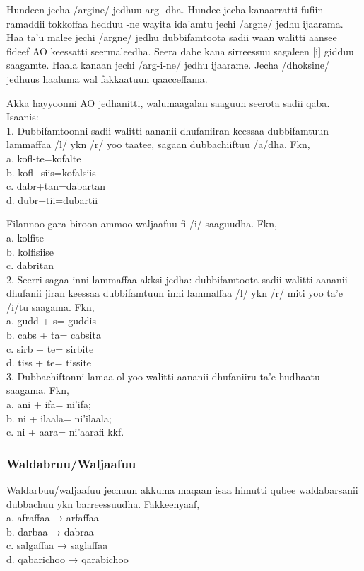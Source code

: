 \documentclass[11pt,b5paper]{book}
\begin{document}
\begin{itemize}
Hundeen jecha /argine/ jedhuu {arg-} dha. Hundee jecha kanaarratti fufiin ramaddii tokkoffaa hedduu {-ne} wayita ida'amtu jechi /argne/ jedhu ijaarama. Haa ta'u malee jechi /argne/ jedhu dubbifamtoota sadii waan walitti aansee fideef AO keessatti seermaleedha. Seera dabe kana sirreessuu sagaleen [i] gidduu saagamte. Haala kanaan jechi /arg-i-ne/ jedhu ijaarame. Jecha /dhoksine/ jedhuus haaluma wal fakkaatuun qaacceffama. 

Akka hayyoonni AO jedhanitti, walumaagalan saaguun seerota sadii qaba\cite{owens1985grammar}. Isaanis:\\ 
1. Dubbifamtoonni sadii walitti aananii dhufaniiran  keessaa dubbifamtuun lammaffaa /l/ ykn /r/ yoo taatee,  sagaan dubbachiiftuu /a/dha. Fkn,  \\
a. kofl-te=kofalte \\
b. kofl+siis=kofalsiis  \\
c. dabr+tan=dabartan  \\
d. dubr+tii=dubartii  

Filannoo gara biroon ammoo waljaafuu fi /i/ saaguudha. Fkn, \\
a. kolfite \\
b. kolfisiise \\
c. dabritan \\
2. Seerri sagaa inni lammaffaa akksi jedha: dubbifamtoota sadii  walitti aananii dhufanii jiran keessaa dubbifamtuun inni  lammaffaa /l/ ykn /r/ miti yoo ta’e /i/tu saagama. Fkn,  \\
a. gudd + s= guddis \\
b. cabs + ta= cabsita \\
c. sirb + te= sirbite \\
d. tiss + te= tissite \\
3. Dubbachiftonni lamaa ol yoo walitti aananii dhufaniiru ta’e  hudhaatu saagama. Fkn,  \\
a. ani + ifa= ni’ifa; \\
b. ni + ilaala= ni’ilaala;\\
c. ni + aara= ni’aarafi kkf. 

\subsubsection{Waldabruu/Waljaafuu}

Waldarbuu/waljaafuu jechuun akkuma maqaan isaa himutti  qubee waldabarsanii dubbachuu ykn barreessuudha.  Fakkeenyaaf, \\
a. afraffaa → arfaffaa  \\
b. darbaa → dabraa  \\
c. salgaffaa → saglaffaa  \\
d. qabarichoo → qarabichoo 


\end{itemize}
\end{document}
